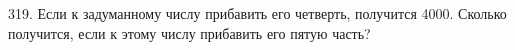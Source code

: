 319. Если к задуманному числу прибавить его четверть, получится 4000. Сколько получится, если к этому числу прибавить его пятую часть?\\

